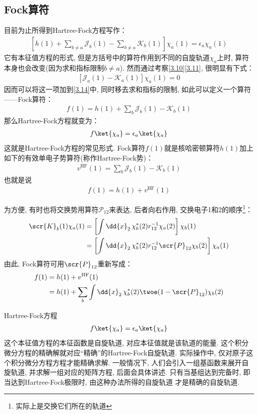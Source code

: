 \subsection{Fock算符}
目前为止所得到Hartree-Fock方程写作：
\begin{align}
	\label{3.14}
	\left[ h(1) + \sum_{b\neq a}\mathscr{J}_b(1) - \sum_{b\neq a}\mathscr{K}_b(1)   \right]\chi_a(1) = \epsilon_a\chi_a(1)
\end{align}
它有本征值方程的形式, 
但是方括号中的算符作用到不同的自旋轨道$\chi_a$上时, 
算符本身也会改变(因为求和指标限制$b\neq a$). 
然而通过考察\autoref{3.10}\autoref{3.11}, 
很明显有下式：
\begin{align}
	\left[ \mathscr{J}_a(1) - \mathscr{K}_a(1)  \right]\chi_a(1) = 0
\end{align}
因而可以将这一项加到\autoref{3.14}中, 
同时移去求和指标的限制, 
如此可以定义一个算符——Fock算符：
\begin{align}
	\label{3.16}
	f(1) = h(1) + \sum_{b}\mathscr{J}_b(1) - \mathscr{K}_b(1)
\end{align}
那么Hartree-Fock方程就变为：
\begin{align}
	\label{3.17}
	f\ket{\chi_a} = \epsilon_a\ket{\chi_a}
\end{align}
这就是Hartree-Fock方程的常见形式. 
Fock算符$f(1)$就是核哈密顿算符$h(1)$加上如下的有效单电子势算符(称作Hartree-Fock势)：
\begin{align}
	\label{3.18}
	v^\mathrm{HF}(1) = \sum_b\mathscr{J}_b(1) - \mathscr{K}_b(1)
\end{align}
也就是说
\begin{align}
	f(1) = h(1) + v^\mathrm{HF}(1)
\end{align}

为方便, 有时也将交换势用算符$\mathscr{P}_{12}$来表达, 后者向右作用, 交换电子1和2的顺序\footnote{实际上是交换它们所在的轨道}：
\begin{align}
	\scr{K}_b(1)\chi_a(1) & = \left[ \int\dd{x}_2\,\chi_b^*(2)r_{12}^{-1}\chi_a(2) \right]\chi_b(1)\notag\\
	& = \left[ \int\dd{x}_2\,\chi_b^*(2)r_{12}^{-1}\scr{P}_{12}\chi_b(2) \right]\chi_a(1)
\end{align}
由此, 
Fock算符可用$\scr{P}_{12}$重新写成：
\begin{align}
	f(1) & = h(1) + v^\mathrm{HF}(1) \notag \\
	& = h(1) + \sum_b\int\dd{x}_2\,\chi_b^*(2)\twoe(1-\scr{P}_{12})\chi_b(2)
\end{align}

Hartree-Fock方程
\begin{align}
	f\ket{\chi_a} = \epsilon_a\ket{\chi_a}
\end{align}
这个本征值方程的本征函数是自旋轨道, 
对应本征值就是该轨道的能量. 
这个积分微分方程的精确解就对应“精确”的Hartree-Fock自旋轨道. 
实际操作中, 
仅对原子这个积分微分方程方程才能精确求解. 
一般情况下, 
人们会引入一组基函数来展开自旋轨道, 
并求解一组对应的矩阵方程, 
后面会具体讲述. 
只有当基组达到完备时, 
即当达到Hartree-Fock极限时, 
由这种办法所得的自旋轨道 才是精确的\hft 自旋轨道.


